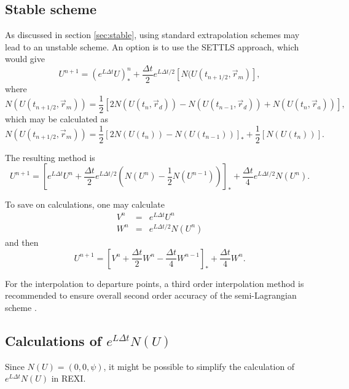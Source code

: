 \documentclass[10pt,a4paper]{article}
\begin{document}
\subsection{Stable scheme}


As discussed in section \ref{sec:stable}, using standard extrapolation schemes may lead to an unstable scheme. An option is to use the SETTLS approach, which would give
\begin{equation}
U^{n+1}=(e^{L \Delta t} U)^{n}_{*}+\frac{\Delta t}{2}e^{L\Delta t/2}\left[  N(U(t_{n+1/2}, \vec{r}_m)\right],
\end{equation}
where 
\begin{equation}
 N(U(t_{n+1/2}, \vec{r}_m)) = 
\frac{1}{2}\left[2 N(U(t_{n}, \vec{r}_d))- N(U(t_{n-1}, \vec{r}_d))+  N(U(t_{n}, \vec{r}_a))\right],
\end{equation}
which may be calculated as
\begin{equation}
 N(U(t_{n+1/2}, \vec{r}_m)) = 
\frac{1}{2}\left[ 2 N(U(t_{n}))- N(U(t_{n-1}))\right]_* +  \frac{1}{2}\left[N(U(t_{n}))\right].
\end{equation}


The resulting method is 
\begin{equation}
U^{n+1}=\left[e^{L \Delta t} U^n+\frac{\Delta t}{2}e^{L\Delta t/2}\left( N(U^n)- \frac{1}{2}N(U^{n-1})\right) \right]_*+\frac{\Delta t}{4}e^{L\Delta t/2}N(U^n).
\end{equation}

To save on calculations, one may calculate
\begin{eqnarray}
V^n&=&e^{L \Delta t} U^n \\
W^n&=&e^{L \Delta t/2} N(U^n)
\end{eqnarray}
and then
\begin{equation}
U^{n+1}=\left[V^n+\frac{\Delta t}{2}W^n - \frac{\Delta t}{4}W^{n-1} \right]_*+\frac{\Delta t}{4}W^n.
\end{equation}

For the interpolation to departure points, a third order interpolation method is recommended to ensure overall second order accuracy of the semi-Lagrangian scheme \cite{Peixoto2014}.

\subsection{Calculations of $e^{L\Delta t}N(U)$ }

Since $N(U)=(0,0,\psi)$, it might be possible to simplify the calculation of $e^{L\Delta t}N(U)$ in REXI.
\end{document}
